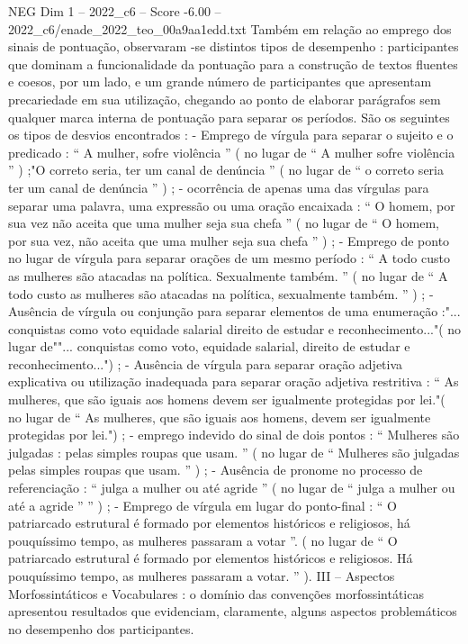 \begin{textsample}{NEG Dim 1 – 2022\_c6 – Score -6.00 – 2022\_c6/enade\_2022\_teo\_00a9aa1edd.txt}
Também em relação ao emprego dos sinais de pontuação, observaram -se distintos tipos de desempenho : participantes que dominam a funcionalidade da pontuação para a construção de textos fluentes e coesos, por um lado, e um grande número de participantes que apresentam precariedade em sua utilização, chegando ao ponto de elaborar parágrafos sem qualquer marca interna de pontuação para separar os períodos.
São os seguintes os tipos de desvios encontrados : - Emprego de vírgula para separar o sujeito e o predicado : “ A mulher, sofre violência ” ( no lugar de “ A mulher sofre violência ” ) ;"O correto seria, ter um canal de denúncia ” ( no lugar de “ o correto seria ter um canal de denúncia ” ) ; - ocorrência de apenas uma das vírgulas para separar uma palavra, uma expressão ou uma oração encaixada : “ O homem, por sua vez não aceita que uma mulher seja sua chefa ” ( no lugar de “ O homem, por sua vez, não aceita que uma mulher seja sua chefa ” ) ; - Emprego de ponto no lugar de vírgula para separar orações de um mesmo período : “ A todo custo as mulheres são atacadas na política.
Sexualmente também. ” ( no lugar de “ A todo custo as mulheres são atacadas na política, sexualmente também. ” ) ; - Ausência de vírgula ou conjunção para separar elementos de uma enumeração :"... conquistas como voto equidade salarial direito de estudar e reconhecimento..."( no lugar de""... conquistas como voto, equidade salarial, direito de estudar e reconhecimento...") ; - Ausência de vírgula para separar oração adjetiva explicativa ou utilização inadequada para separar oração adjetiva restritiva : “ As mulheres, que são iguais aos homens devem ser igualmente protegidas por lei."( no lugar de “ As mulheres, que são iguais aos homens, devem ser igualmente protegidas por lei.") ; - emprego indevido do sinal de dois pontos : “ Mulheres são julgadas : pelas simples roupas que usam. ” ( no lugar de “ Mulheres são julgadas pelas simples roupas que usam. ” ) ; - Ausência de pronome no processo de referenciação : “ julga a mulher ou até agride ” ( no lugar de “ julga a mulher ou até a agride ” ” ) ; - Emprego de vírgula em lugar do ponto-final : “ O patriarcado estrutural é formado por elementos históricos e religiosos, há pouquíssimo tempo, as mulheres passaram a votar ”. ( no lugar de “ O patriarcado estrutural é formado por elementos históricos e religiosos.
Há pouquíssimo tempo, as mulheres passaram a votar. ” ).
III – Aspectos Morfossintáticos e Vocabulares : o domínio das convenções morfossintáticas apresentou resultados que evidenciam, claramente, alguns aspectos problemáticos no desempenho dos participantes.

\end{textsample}
